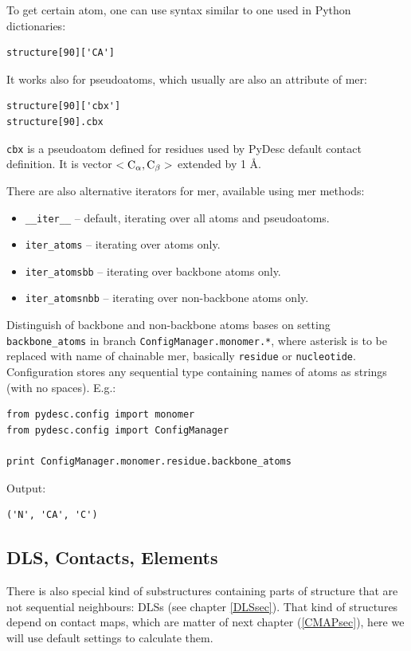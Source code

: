 \documentclass{article}
\begin{document}
To get certain atom, one can use syntax similar to one used in Python dictionaries:
\begin{lstlisting}
structure[90]['CA']
\end{lstlisting}
It works also for pseudoatoms, which usually are also an attribute of mer:
\begin{lstlisting}
structure[90]['cbx']
structure[90].cbx
\end{lstlisting}

\texttt{cbx} is a pseudoatom defined for residues used by PyDesc default contact definition. It is vector $<{\rm C_{\alpha{}}}, {\rm C_{\beta{}}}>$ extended by 1 \AA{}.


There are also alternative iterators for mer, available using mer methods:
\begin{itemize}
    \item \texttt{\_\_iter\_\_} -- default, iterating over all atoms and pseudoatoms.
    \item \texttt{iter\_{}atoms} -- iterating over atoms only.
    \item \texttt{iter\_{}atomsbb} -- iterating over backbone atoms only.
    \item \texttt{iter\_{}atomsnbb} -- iterating over non-backbone atoms only.
\end{itemize}

Distinguish of backbone and non-backbone atoms bases on setting \texttt{backbone\_{}atoms} in branch \texttt{ConfigManager.monomer.*}, where asterisk is to be replaced with name of chainable mer, basically \texttt{residue} or \texttt{nucleotide}. Configuration stores any sequential type containing names of atoms as strings (with no spaces). E.g.:
\begin{lstlisting}
from pydesc.config import monomer
from pydesc.config import ConfigManager

print ConfigManager.monomer.residue.backbone_atoms 
\end{lstlisting}
Output:
\begin{lstlisting}
('N', 'CA', 'C')
\end{lstlisting}

%
%
%
\subsection{DLS, Contacts, Elements}

There is also special kind of substructures containing parts of structure that are not sequential neighbours: DLSs (see chapter \ref{DLSsec}). That kind of structures depend on contact maps, which are matter of next chapter (\ref{CMAPsec}), here we will use default settings to calculate them.
\end{document}

